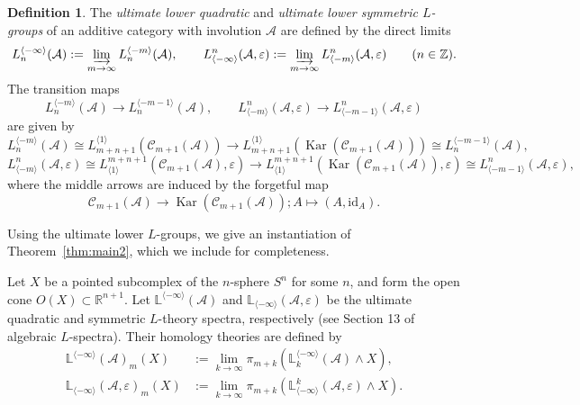 \documentclass{article}
\theoremstyle{definition}
\newtheorem{defn}[theorem]{Definition}
\newcommand{\id}{\mathrm{id}}
\begin{document}
\begin{defn}
The \emph{ultimate lower quadratic} and \emph{ultimate lower symmetric \( L \)-groups} of an additive category with involution \( \mathcal{A} \) are defined by the direct limits
\[
L_n^{\langle -\infty \rangle}(\mathcal{A}) := \varinjlim_{m \to \infty} L_n^{\langle -m \rangle}(\mathcal{A}), \qquad 
L^n_{\langle -\infty \rangle}(\mathcal{A}, \varepsilon) := \varinjlim_{m \to \infty} L^n_{\langle -m \rangle}(\mathcal{A}, \varepsilon) \qquad (n \in \mathbb{Z}).
\]
The transition maps
\[
L_n^{\langle -m \rangle}(\mathcal{A}) \longrightarrow L_n^{\langle -m-1 \rangle}(\mathcal{A}), \qquad
L^n_{\langle -m \rangle}(\mathcal{A}, \varepsilon) \longrightarrow L^n_{\langle -m-1 \rangle}(\mathcal{A}, \varepsilon)
\]
are given by
$$L_n^{\langle -m \rangle}(\mathcal{A})\cong L_{m+n+1}^{\langle 1 \rangle}(\mathcal{C}_{m+1}(\mathcal{A}))  \rightarrow L_{m+n+1}^{\langle 1 \rangle}(\operatorname{Kar}(\mathcal{C}_{m+1}(\mathcal{A}))) \cong L_n^{\langle -m-1 \rangle}(\mathcal{A}),$$
$$L^n_{\langle -m \rangle}(\mathcal{A}, \varepsilon) \cong L^{m+n+1}_{\langle 1 \rangle}(\mathcal{C}_{m+1}(\mathcal{A}), \varepsilon) \rightarrow L^{m+n+1}_{\langle 1 \rangle}(\operatorname{Kar}(\mathcal{C}_{m+1}(\mathcal{A})), \varepsilon)   \cong L^n_{\langle -m-1 \rangle}(\mathcal{A}, \varepsilon),$$
where the middle arrows are induced by the forgetful map 
$$\mathcal{C}_{m+1}(\mathcal{A})\rightarrow \operatorname{Kar}(\mathcal{C}_{m+1}(\mathcal{A})); A\mapsto (A, \id_A).$$
\end{defn}

Using the ultimate lower \( L \)-groups, we give an instantiation of Theorem~\ref{thm:main2}, which we include for completeness.

Let \( X \) be a pointed subcomplex of the \( n \)-sphere \( S^n \) for some \( n \), and form the open cone \( O(X) \subset \mathbb{R}^{n+1} \). Let \( \mathbb{L}^{\langle -\infty \rangle}(\mathcal{A}) \) and \( \mathbb{L}_{\langle -\infty \rangle}(\mathcal{A}, \varepsilon) \) be the ultimate quadratic and symmetric \( L \)-theory spectra, respectively (see Section 13 of \cite{ranicki1992algebraic} algebraic $L$-spectra). Their homology theories are defined by
\begin{align}
    \mathbb{L}^{\langle -\infty \rangle}(\mathcal{A})_m(X) &:= \lim_{k \to \infty} \pi_{m+k}(\mathbb{L}_k^{\langle -\infty \rangle}(\mathcal{A}) \wedge X),\\
 \mathbb{L}_{\langle -\infty \rangle}(\mathcal{A}, \varepsilon)_m(X) &:= \lim_{k \to \infty} \pi_{m+k}(\mathbb{L}^{k}_{\langle -\infty \rangle}(\mathcal{A}, \varepsilon) \wedge X).
\end{align}
\end{document}
